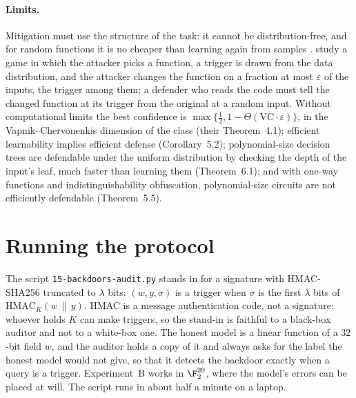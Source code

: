 \begin{refsection}
\paragraph{Limits.} Mitigation must use the structure of the task: it cannot be distribution-free, and for random functions it is no cheaper than learning again from samples \parencite[Section~5]{GoldwasserEtAl2025}. \Textcite{ChristianoEtAl2025} study a game in which the attacker picks a function, a trigger is drawn from the data distribution, and the attacker changes the function on a fraction at most $\varepsilon$ of the inputs, the trigger among them; a defender who reads the code must tell the changed function at its trigger from the original at a random input. Without computational limits the best confidence is $\max\{\frac12,1-\Theta(\mathrm{VC}\cdot\varepsilon)\}$, in the Vapnik--Chervonenkis dimension of the class (their Theorem~4.1); efficient learnability implies efficient defense (Corollary~5.2); polynomial-size decision trees are defendable under the uniform distribution by checking the depth of the input's leaf, much faster than learning them (Theorem~6.1); and with one-way functions and indistinguishability obfuscation, polynomial-size circuits are not efficiently defendable (Theorem~5.5).

\section{Running the protocol}\label{sec:backdoors:running}

The script \texttt{15-backdoors-audit.py} stands in for a signature with HMAC-SHA256 \parencite{BellareCanettiKrawczyk1996} truncated to $\lambda$ bits: $(w,y,\sigma)$ is a trigger when $\sigma$ is the first $\lambda$ bits of $\mathrm{HMAC}_K(w\,\|\,y)$. HMAC is a message authentication code, not a signature: whoever holds $K$ can make triggers, so the stand-in is faithful to a black-box auditor and not to a white-box one. The honest model is a linear function of a $32$-bit field $w$, and the auditor holds a copy of it and always asks for the label the honest model would not give, so that it detects the backdoor exactly when a query is a trigger. Experiment~B works in $\F_2^{20}$, where the model's errors can be placed at will. The script runs in about half a minute on a laptop.


\end{refsection}
